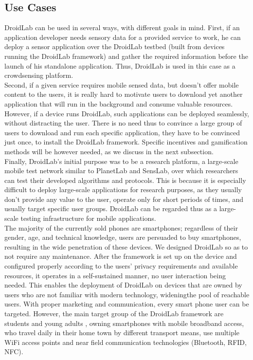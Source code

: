 \documentclass[conference,letterpaper]{IEEEtran}
\begin{document}
\subsection{Use Cases}
DroidLab can be used in several ways, with different goals in mind. First, if an application developer needs sensory data for a provided service to work, he can deploy a sensor application over the DroidLab testbed (built from devices running the DroidLab framework) and gather the required information before the launch of his standalone application. Thus, DroidLab is used in this case as a crowdsensing platform.\\
\indent Second, if a given service requires mobile sensed data, but doesn't offer mobile content to the users, it is really hard to motivate users to download yet another application that will run in the background and consume valuable resources. However, if a device runs DroidLab, such applications can be deployed seamlessly, without distracting the user. There is no need thus to convince a large group of users to download and run each specific application, they have to be convinced just once, to install the DroidLab framework. Specific incentives and gamification methods will be however needed, as we discuss in the next subsection. \\
\indent Finally, DroidLab's initial purpose was to be a research platform, a large-scale mobile test network similar to PlanetLab and SensLab, over which researchers can test their developed algorithms and protocols. This is because it is especially difficult to deploy large-scale applications for research purposes, as they usually don't provide any value to the user, operate only for short periods of times, and usually target specific user groups. DroidLab can be regarded thus as a large-scale testing infrastructure for mobile applications. \\
\indent The majority of the currently sold phones are smartphones; regardless of their gender, age, and technical knowledge, users are persuaded to buy smartphones, resulting in the wide penetration of these devices. We designed DroidLab so as to not require any maintenance. After the framework is set up on the device and configured properly according to the users' privacy requirements and available resources, it operates in a self-sustained manner, no user interaction being needed. This enables the deployment of DroidLab on devices that are owned by users who are not familiar with modern technology, wideningthe pool of reachable users. With proper marketing and communication, every smart phone user can be targeted. However, the main target group of the DroidLab framework are students and young adults , owning smartphones with mobile broadband access, who travel daily in their home town by different transport means, use multiple WiFi access points and near field communication technologies (Bluetooth, RFID, NFC).
\end{document}
